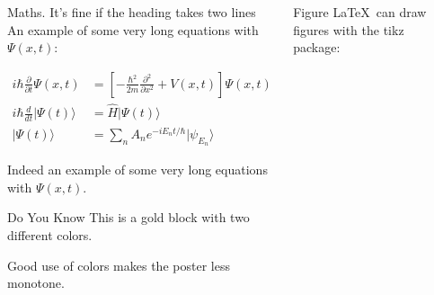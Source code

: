 \documentclass{purdue-poster}
\newlength{\postercolsep}
\newcommand{\postercolwidth}[1]{\dimeval{#1-\postercolsep}}
\begin{document}
\begin{frame}{}
\begin{columns}[onlytextwidth, t]
\begin{column}{\postercolwidth{.6\linewidth}}
\begin{columns}[onlytextwidth, t]
\begin{column}{\postercolwidth{.5\linewidth}}
            \end{column}

            \begin{column}{\postercolwidth{.5\linewidth}}
                
                \begin{plainblock}{Maths. It's fine if the heading takes two lines}
                    An example of some very long equations with $\Psi (x,t)$:
                    
                    \begin{align}
                    i\hbar {\frac {\partial }{\partial t}}\Psi (x,t)&=\left[-{\frac {\hbar ^{2}}{2m}}{\frac {\partial ^{2}}{\partial x^{2}}}+V(x,t)\right]\Psi (x,t) \\
                    i\hbar {\frac {d}{dt}}\vert \Psi (t)\rangle &={\hat {H}}\vert \Psi (t)\rangle \\ 
                    |\Psi (t)\rangle &=\sum _{n}A_{n}e^{{-iE_{n}t}/\hbar }|\psi _{E_{n}}\rangle
                    \end{align}
                    
                    Indeed an example of some very long equations with $\Psi (x,t)$.
                \end{plainblock}

                \vspace{1em}

                \begin{block}{Do You Know}
                    This is a gold block with two different colors.
                    
                    Good use of colors makes the poster less monotone.
                \end{block}

            \end{column}
            
        \end{columns}
    
    \end{column}

    \begin{column}{\postercolwidth{.4\linewidth}}
        
        \begin{plainblock}{Figure}
            \LaTeX\ can draw figures with the tikz package:


\end{plainblock}
\end{column}
\end{columns}
\end{frame}
\end{document}

